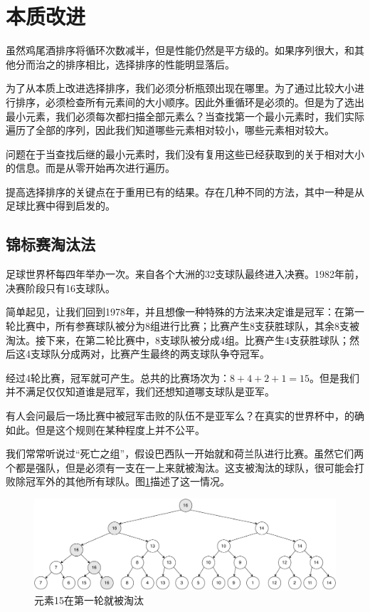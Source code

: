 \documentclass[b5paper]{ctexart}
\begin{document}

\section{本质改进}

虽然鸡尾酒排序将循环次数减半，但是性能仍然是平方级的。如果序列很大，和其他分而治之的排序相比，选择排序的性能明显落后。

为了从本质上改进选择排序，我们必须分析瓶颈出现在哪里。为了通过比较大小进行排序，必须检查所有元素间的大小顺序。因此外重循环是必须的。但是为了选出最小元素，我们必须每次都扫描全部元素么？当查找第一个最小元素时，我们实际遍历了全部的序列，因此我们知道哪些元素相对较小，哪些元素相对较大。

问题在于当查找后继的最小元素时，我们没有复用这些已经获取到的关于相对大小的信息。而是从零开始再次进行遍历。

提高选择排序的关键点在于重用已有的结果。存在几种不同的方法，其中一种是从足球比赛中得到启发的。

\subsection{锦标赛淘汰法}

足球世界杯每四年举办一次。来自各个大洲的32支球队最终进入决赛。1982年前，决赛阶段只有16支球队\cite{wiki-wc}。

简单起见，让我们回到1978年，并且想像一种特殊的方法来决定谁是冠军：在第一轮比赛中，所有参赛球队被分为8组进行比赛；比赛产生8支获胜球队，其余8支被淘汰。接下来，在第二轮比赛中，8支球队被分成4组。比赛产生4支获胜球队；然后这4支球队分成两对，比赛产生最终的两支球队争夺冠军。

经过4轮比赛，冠军就可产生。总共的比赛场次为：$8+4+2+1 = 15$。但是我们并不满足仅仅知道谁是冠军，我们还想知道哪支球队是亚军。

有人会问最后一场比赛中被冠军击败的队伍不是亚军么？在真实的世界杯中，的确如此。但是这个规则在某种程度上并不公平。

我们常常听说过“死亡之组”，假设巴西队一开始就和荷兰队进行比赛。虽然它们两个都是强队，但是必须有一支在一上来就被淘汰。这支被淘汰的球队，很可能会打败除冠军外的其他所有球队。图\ref{fig:tournament-tree-1}描述了这一情况。

\begin{figure}[htbp]
  \centering
  \includegraphics[scale=0.6]{img/tournament-tree-1}
  \caption{元素15在第一轮就被淘汰}
  \label{fig:tournament-tree-1}
\end{figure}
\end{document}
